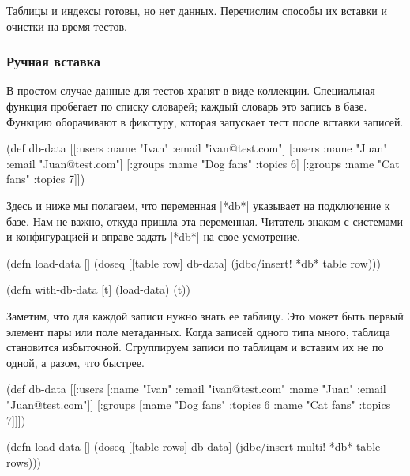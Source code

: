 Таблицы и индексы готовы, но нет данных. Перечислим способы их вставки и очистки
на время тестов.

\subsubsection*{Ручная вставка}

В простом случае данные для тестов хранят в виде коллекции. Специальная функция
пробегает по списку словарей; каждый словарь это запись в базе. Функцию
оборачивают в фикстуру, которая запускает тест после вставки записей.

\begin{english}
  \begin{clojure}
(def db-data
  [[:users {:name "Ivan" :email "ivan@test.com"}]
   [:users {:name "Juan" :email "Juan@test.com"}]
   [:groups {:name "Dog fans" :topics 6}]
   [:groups {:name "Cat fans" :topics 7}]])
  \end{clojure}
\end{english}

Здесь и ниже мы полагаем, что переменная \spverb|*db*| указывает на подключение
к базе. Нам не важно, откуда пришла эта переменная. Читатель знаком с системами
и конфигурацией и вправе задать \spverb|*db*| на свое усмотрение.

\begin{english}
  \begin{clojure}
(defn load-data []
  (doseq [[table row] db-data]
    (jdbc/insert! *db* table row)))

(defn with-db-data [t]
  (load-data)
  (t))
  \end{clojure}
\end{english}

Заметим, что для каждой записи нужно знать ее таблицу. Это может быть первый
элемент пары  или поле метаданных. Когда записей одного
типа много, таблица становится избыточной. Сгруппируем записи по таблицам и
вставим их не по одной, а разом, что быстрее.

\begin{english}
  \begin{clojure}
(def db-data
  [[:users [{:name "Ivan" :email "ivan@test.com"}
            {:name "Juan" :email "Juan@test.com"}]]
   [:groups [{:name "Dog fans" :topics 6}
             {:name "Cat fans" :topics 7}]]])

(defn load-data []
  (doseq [[table rows] db-data]
    (jdbc/insert-multi! *db* table rows)))
  \end{clojure}
\end{english}


